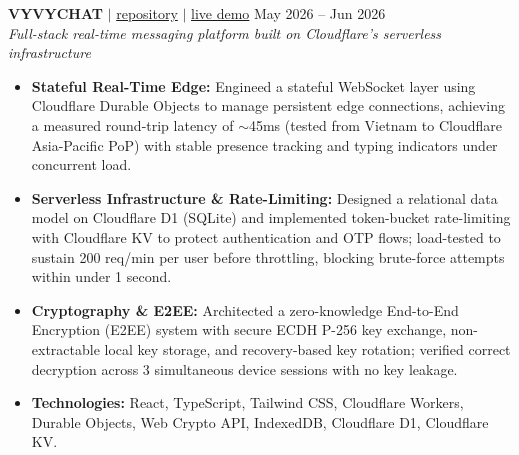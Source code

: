 \documentclass[10pt,a4paper]{article}
\begin{document}
\noindent \textbf{VYVYCHAT} $|$ \href{https://github.com/vyquochuy/vyvychat}{repository} $|$ \href{https://vyvychat.myvault-service.workers.dev/}{live demo} \hfill May 2026 -- Jun 2026\\
\textit{Full-stack real-time messaging platform built on Cloudflare's serverless infrastructure}
\begin{itemize}[leftmargin=0.25in, nosep]
    \item \textbf{Stateful Real-Time Edge:} Engineed a stateful WebSocket layer using Cloudflare Durable Objects to manage persistent edge connections, achieving a measured round-trip latency of $\sim$45ms (tested from Vietnam to Cloudflare Asia-Pacific PoP) with stable presence tracking and typing indicators under concurrent load.
    \item \textbf{Serverless Infrastructure \& Rate-Limiting:} Designed a relational data model on Cloudflare D1 (SQLite) and implemented token-bucket rate-limiting with Cloudflare KV to protect authentication and OTP flows; load-tested to sustain 200 req/min per user before throttling, blocking brute-force attempts within under 1 second.
    \item \textbf{Cryptography \& E2EE:} Architected a zero-knowledge End-to-End Encryption (E2EE) system with secure ECDH P-256 key exchange, non-extractable local key storage, and recovery-based key rotation; verified correct decryption across 3 simultaneous device sessions with no key leakage.
    \item \textbf{Technologies:} React, TypeScript, Tailwind CSS, Cloudflare Workers, Durable Objects, Web Crypto API, IndexedDB, Cloudflare D1, Cloudflare KV.
\end{itemize}
\vspace{10pt}
\end{document}
